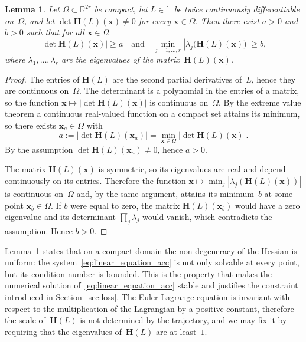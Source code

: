 \documentclass[sn-mathphys-num]{sn-jnl}
\theoremstyle{thmstylethree}
\theoremstyle{thmstyletwo}
\theoremstyle{thmstyleone}
\newtheorem{lemma}{Lemma}
\begin{document}
\begin{lemma} \label{lemma1}
Let $\Omega \subset \mathbb{R}^{2r}$ be compact, let $L \in \mathbb{L}$ be twice continuously differentiable on~$\Omega$, and let $\det \mathbf{H}(L)(\mathbf{x}) \neq 0$ for every $\mathbf{x} \in \Omega$. Then there exist $a > 0$ and $b > 0$ such that for all $\mathbf{x} \in \Omega$
\[
\left| \det \mathbf{H}(L)(\mathbf{x}) \right| \ge a
\quad\text{and}\quad
\min_{j = 1, \dots, r} \left| \lambda_j \bigl( \mathbf{H}(L)(\mathbf{x}) \bigr) \right| \ge b,
\]
where $\lambda_1, \dots, \lambda_r$ are the eigenvalues of the matrix~$\mathbf{H}(L)(\mathbf{x})$.
\end{lemma}
\begin{proof}
The entries of $\mathbf{H}(L)$ are the second partial derivatives of~$L$, hence they are continuous on~$\Omega$. The determinant is a polynomial in the entries of a matrix, so the function $\mathbf{x} \mapsto |\det \mathbf{H}(L)(\mathbf{x})|$ is continuous on~$\Omega$. By the extreme value theorem a continuous real-valued function on a compact set attains its minimum, so there exists $\mathbf{x}_a \in \Omega$ with
\[
a := \left| \det \mathbf{H}(L)(\mathbf{x}_a) \right| = \min_{\mathbf{x} \in \Omega} \left| \det \mathbf{H}(L)(\mathbf{x}) \right|.
\]
By the assumption $\det \mathbf{H}(L)(\mathbf{x}_a) \neq 0$, hence $a > 0$.

The matrix $\mathbf{H}(L)(\mathbf{x})$ is symmetric, so its eigenvalues are real and depend continuously on its entries. Therefore the function $\mathbf{x} \mapsto \min_{j} |\lambda_j(\mathbf{H}(L)(\mathbf{x}))|$ is continuous on~$\Omega$ and, by the same argument, attains its minimum~$b$ at some point $\mathbf{x}_b \in \Omega$. If $b$ were equal to zero, the matrix $\mathbf{H}(L)(\mathbf{x}_b)$ would have a zero eigenvalue and its determinant $\prod_j \lambda_j$ would vanish, which contradicts the assumption. Hence $b > 0$.
\end{proof}

Lemma~\ref{lemma1} states that on a compact domain the non-degeneracy of the Hessian is uniform: the system~\eqref{eq:linear_equation_acc} is not only solvable at every point, but its condition number is bounded. This is the property that makes the numerical solution of~\eqref{eq:linear_equation_acc} stable and justifies the constraint introduced in Section~\ref{sec:loss}. The Euler-Lagrange equation is invariant with respect to the multiplication of the Lagrangian by a positive constant, therefore the scale of~$\mathbf{H}(L)$ is not determined by the trajectory, and we may fix it by requiring that the eigenvalues of~$\mathbf{H}(L)$ are at least~$1$.
\end{document}

